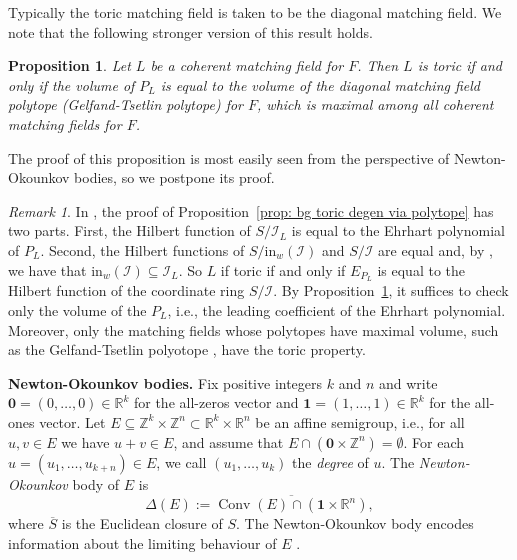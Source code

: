 \documentclass[11pt]{article}
\newcommand{\RR}{\mathbb R}
\newcommand{\ZZ}{\mathbb Z}
\newcommand{\MI}{\mathcal I}
\newcommand{\init}{\text{in}}
\DeclareMathOperator{\conv}{Conv}
\theoremstyle{plain}
\newtheorem{proposition}[theorem]{Proposition}
\theoremstyle{definition}
\theoremstyle{remark}
\newtheorem{remark}[theorem]{Remark}
\begin{document}
Typically the toric matching field is taken to be the diagonal matching field. We note that the following stronger version of this result holds.

\begin{proposition}\label{prop: toric degen via mf polytope volume}
    Let $L$ be a coherent matching field for $F$. Then $L$ is toric if and only if the volume of $P_L$ is equal to the volume of the diagonal matching field  polytope (Gelfand-Tsetlin polytope) for $F$, which is maximal among all coherent matching fields for $F$.
\end{proposition}

The proof of this proposition is most easily seen from the perspective of Newton-Okounkov bodies, so we postpone its proof.

\begin{remark}
    In \cite{clarke2022combinatorial, clarke2022partial}, the proof of Proposition~\ref{prop: bg toric degen via polytope} has two parts. First, the Hilbert function of $S/\MI_L$ is equal to the Ehrhart polynomial of $P_L$. Second, the Hilbert functions of $S/\init_w(\MI)$ and $S/\MI$ are equal and, by \cite[Lemma~11.3]{sturmfels1996grobner}, we have that $\init_w(\MI) \subseteq \MI_L$. So $L$ if toric if and only if $E_{P_L}$ is equal to the Hilbert function of the coordinate ring $S/\MI$. By Proposition~\ref{prop: toric degen via mf polytope volume}, it suffices to check only the volume of the $P_L$, i.e., the leading coefficient of the Ehrhart polynomial. Moreover, only the matching fields whose polytopes have maximal volume, such as the Gelfand-Tsetlin polyotope \cite{ardila2011gelfand, liu2019gelfand}, have the toric property. 
\end{remark}

\medskip

\noindent
\textbf{Newton-Okounkov bodies.}
Fix positive integers $k$ and $n$ and write $\mathbf{0} = (0, \dots, 0) \in \RR^k$ for the all-zeros vector and $\mathbf{1} = (1, \dots, 1) \in \RR^k$ for the all-ones vector.  
Let $E \subseteq \ZZ^k \times \ZZ^n \subset \RR^k \times \RR^n$ be an affine semigroup, i.e., for all $u, v \in E$ we have $u+v \in E$, and assume that $E \cap (\mathbf{0} \times \ZZ^n) = \emptyset$. For each $u = (u_1, \dots, u_{k+n}) \in E$, we call $(u_1, \dots, u_k)$ the \textit{degree} of $u$. The \textit{Newton-Okounkov} body of $E$ is 
\[
\Delta(E) := \overline{\conv(E) \cap (\mathbf{1} \times \RR^n)},
\]
where $\overline S$ is the Euclidean closure of $S$. The Newton-Okounkov body encodes information about the limiting behaviour of $E$ \cite{kaveh2012newton}.
\end{document}
